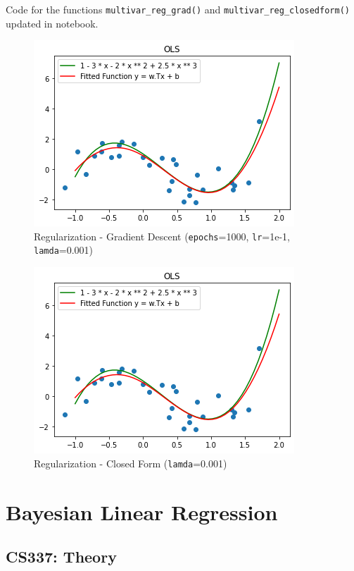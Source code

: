 \documentclass[12pt, fleqn]{article}
\begin{document}
\subsubsection{}
Code for the functions \verb!multivar_reg_grad()! and \verb!multivar_reg_closedform()! updated in notebook.
\begin{figure}[H]
  \centering
  \includegraphics[scale=0.7]{multivar_reg_grad.png}
  \caption{Regularization - Gradient Descent (\texttt{epochs}=1000, \texttt{lr}=1e-1, \texttt{lamda}=0.001)}
\end{figure}
\begin{figure}[H]
  \centering
  \includegraphics[scale=0.7]{multivar_reg_closedform.png}
  \caption{Regularization - Closed Form (\texttt{lamda}=0.001)}
\end{figure}


\newpage
\section{Bayesian Linear Regression}

\subsection{CS337: Theory}
\end{document}
